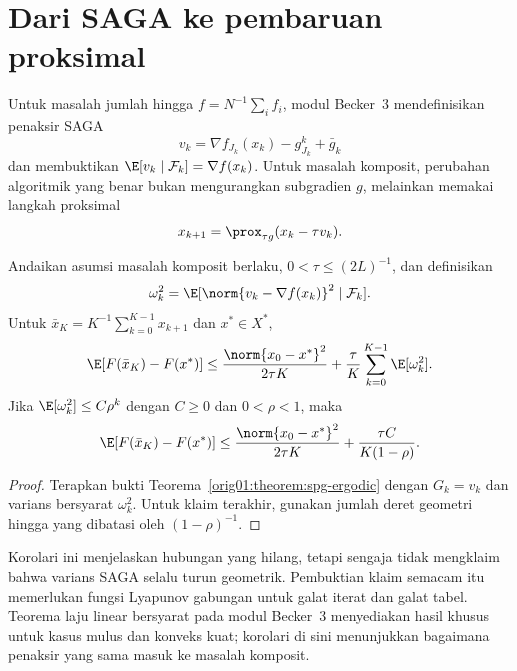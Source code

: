 \section{Dari SAGA ke pembaruan proksimal}
\label{orig01:section:prox-saga}

Untuk masalah jumlah hingga
$f=N^{-1}\sum_i f_i$, modul Becker~3 mendefinisikan penaksir SAGA
\begin{equation}
  v_k=\nabla f_{J_k}(x_k)-g_{J_k}^k+\bar g_k
\end{equation}
dan membuktikan
$\E[v_k\mid\mathcal F_k]=\nabla f(x_k)$. Untuk masalah komposit, perubahan
algoritmik yang benar bukan mengurangkan subgradien $g$, melainkan memakai
langkah proksimal
\begin{equation}
  \label{orig01:eq:prox-saga}
  x_{k+1}=\prox_{\tau g}(x_k-\tau v_k).
\end{equation}

\begin{cor}
  \label{orig01:cor:prox-saga-bridge}
  Andaikan asumsi masalah komposit berlaku, $0<\tau\leq(2L)^{-1}$, dan
  definisikan
  \begin{equation}
    \omega_k^2
    =\E[\norm{v_k-\nabla f(x_k)}^2\mid\mathcal F_k].
  \end{equation}
  Untuk $\bar x_K=K^{-1}\sum_{k=0}^{K-1}x_{k+1}$ dan $x^*\in X^*$,
  \begin{equation}
    \label{orig01:eq:prox-saga-bridge}
    \E[F(\bar x_K)-F(x^*)]
    \leq\frac{\norm{x_0-x^*}^2}{2\tau K}
    +\frac{\tau}{K}\sum_{k=0}^{K-1}\E[\omega_k^2].
  \end{equation}
  Jika $\E[\omega_k^2]\leq C\rho^k$ dengan $C\geq0$ dan $0<\rho<1$, maka
  \begin{equation}
    \E[F(\bar x_K)-F(x^*)]
    \leq\frac{\norm{x_0-x^*}^2}{2\tau K}
    +\frac{\tau C}{K(1-\rho)}.
  \end{equation}
\end{cor}

\begin{proof}
  Terapkan bukti Teorema~\ref{orig01:theorem:spg-ergodic} dengan
  $G_k=v_k$ dan varians bersyarat $\omega_k^2$. Untuk klaim terakhir, gunakan
  jumlah deret geometri hingga yang dibatasi oleh $(1-\rho)^{-1}$.
\end{proof}

Korolari ini menjelaskan hubungan yang hilang, tetapi sengaja tidak mengklaim
bahwa varians SAGA selalu turun geometrik. Pembuktian klaim semacam itu
memerlukan fungsi Lyapunov gabungan untuk galat iterat dan galat tabel.
Teorema laju linear bersyarat pada modul Becker~3 menyediakan hasil khusus
untuk kasus mulus dan konveks kuat; korolari di sini menunjukkan bagaimana
penaksir yang sama masuk ke masalah komposit.

